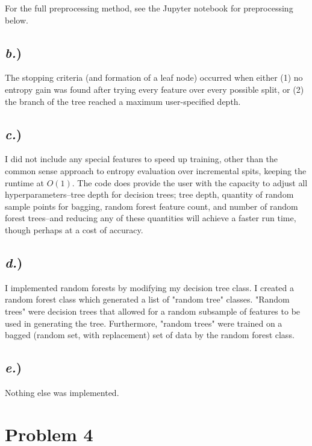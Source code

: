 \documentclass{report}
\begin{document}
For the full preprocessing method, see the Jupyter notebook for preprocessing below.

\subsection*{\textit{b.})}

The stopping criteria (and formation of a leaf node) occurred when either (1) no entropy gain was found after trying every feature over every possible split, or (2) the branch of the tree reached a maximum user-specified depth.


\subsection*{\textit{c.})}

I did not include any special features to speed up training, other than the common sense approach to entropy evaluation over incremental spits, keeping the runtime at $O(1)$. The code does provide the user with the capacity to adjust all hyperparameters--tree depth for decision trees; tree depth, quantity of random sample points for bagging, random forest feature count, and number of random forest trees--and reducing any of these quantities will achieve a faster run time, though perhaps at a cost of accuracy.


\subsection*{\textit{d.})}

I implemented random forests by modifying my decision tree class. I created a random forest class which generated a list of "random tree" classes. "Random trees" were decision trees that allowed for a random subsample of features to be used in generating the tree. Furthermore, "random trees" were trained on a bagged (random set, with replacement) set of data by the random forest class.


\subsection*{\textit{e.})}

Nothing else was implemented.


\newpage
\section*{Problem 4}
\end{document}
